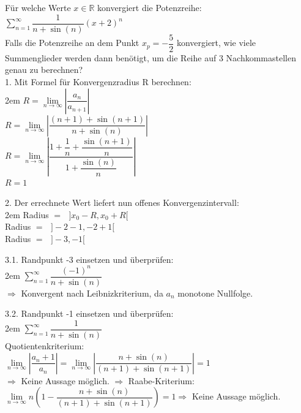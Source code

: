 \documentclass[11pt,final]{scrreprt}
\newcommand{\br} {\medskip\\}
\newcommand{\R} {\mathbb R}
\begin{document}
Für welche Werte $x \in \R$ konvergiert die Potenzreihe:\br
\hspace*{3em}$\sum\limits_{n=1}^\infty \dfrac{1}{n+\sin(n)} (x+2)^n $\br
Falls die Potenzreihe an dem Punkt $x_p=-\dfrac{5}{2}$ konvergiert, wie viele Summenglieder werden dann benötigt, um die Reihe auf 3 Nachkommastellen genau zu berechnen?\br

1. Mit Formel für Konvergenzradius R berechnen:\\

\begingroup
\leftskip2em 
$ R = \lim\limits_{n\to\infty} \left| \dfrac{a_n}{a_{n+1}} \right|$\br
$ R = \lim\limits_{n\to\infty} \left| \dfrac{(n+1)+\sin(n+1)}{n+\sin(n)} \right|$\br
$ R = \lim\limits_{n\to\infty} \left| \dfrac{1+\dfrac{1}{n}+\dfrac{\sin(n+1)}{n}}{1+\dfrac{\sin(n)}{n}} \right|$\\
$ R = 1$\\
\par	
\endgroup 

2. Der errechnete Wert liefert nun offenes Konvergenzintervall:\\

\begingroup
\leftskip2em 
Radius $=\text{ }]x_0-R, x_0+R[ $\\
Radius $=\text{ }]-2-1, -2+1[ $\\
Radius $=\text{ }]-3, -1[ $\\
\par	
\endgroup 

3.1. Randpunkt -3 einsetzen und überprüfen:\\

\begingroup
\leftskip2em 
$ \sum\limits_{n=1}^\infty \dfrac{(-1)^n}{n+\sin(n)}$\br
$ \Rightarrow  $ Konvergent nach Leibnizkriterium, da $a_n$ monotone Nullfolge.\\
\par	
\endgroup 

3.2. Randpunkt -1 einsetzen und überprüfen:\\

\begingroup
\leftskip2em 
$ \sum\limits_{n=1}^\infty \dfrac{1}{n+\sin(n)}$\br
Quotientenkriterium:\br
$ \lim\limits_{n\to\infty} \left| \dfrac{a_n+1}{a_{n}} \right| = \lim\limits_{n\to\infty} \left| \dfrac{n+\sin(n)}{(n+1)+\sin(n+1)} \right| = 1$\br
$\Rightarrow $ Keine Aussage möglich. $\Rightarrow $ Raabe-Kriterium:\br
$\lim\limits_{n\to\infty} n\left(1- \dfrac{n+\sin(n)}{(n+1)+\sin(n+1)} \right) = 1 \Rightarrow $ Keine Aussage möglich.\\
\par	
\endgroup 
\end{document}
